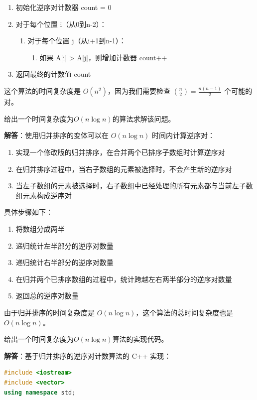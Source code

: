 \documentclass[12pt,twoside]{article}
\begin{document}
\begin{problems}
\begin{enumerate}
\item 初始化逆序对计数器 count = 0
\item 对于每个位置 i（从0到n-2）：
   \begin{enumerate}
   \item 对于每个位置 j（从i+1到n-1）：
      \begin{enumerate}
      \item 如果 A[i] > A[j]，则增加计数器 count++
      \end{enumerate}
   \end{enumerate}
\item 返回最终的计数值 count
\end{enumerate}

这个算法的时间复杂度是 $O(n^2)$，因为我们需要检查 $\binom{n}{2} = \frac{n(n-1)}{2}$ 
个可能的对。

\ppart 给出一个时间复杂度为$O(n\log n)$的算法求解该问题。

\textbf{解答}：使用归并排序的变体可以在 $O(n\log n)$ 时间内计算逆序对：

\begin{enumerate}
\item 实现一个修改版的归并排序，在合并两个已排序子数组时计算逆序对
\item 在归并排序过程中，当右子数组的元素被选择时，不会产生新的逆序对
\item 当左子数组的元素被选择时，右子数组中已经处理的所有元素都与当前左子数组元素构成逆序对
\end{enumerate}

具体步骤如下：
\begin{enumerate}
\item 将数组分成两半
\item 递归统计左半部分的逆序对数量
\item 递归统计右半部分的逆序对数量
\item 在归并两个已排序数组的过程中，统计跨越左右两半部分的逆序对数量
\item 返回总的逆序对数量
\end{enumerate}

由于归并排序的时间复杂度是 $O(n\log n)$，这个算法的总时间复杂度也是 $O(n\log n)$。

\ppart 给出一个时间复杂度为$O(n\log n)$算法的实现代码。

\textbf{解答}：基于归并排序的逆序对计数算法的 C++ 实现：

\begin{lstlisting}[language=C++]
#include <iostream>
#include <vector>
using namespace std;


\end{lstlisting}
\end{problems}
\end{document}
